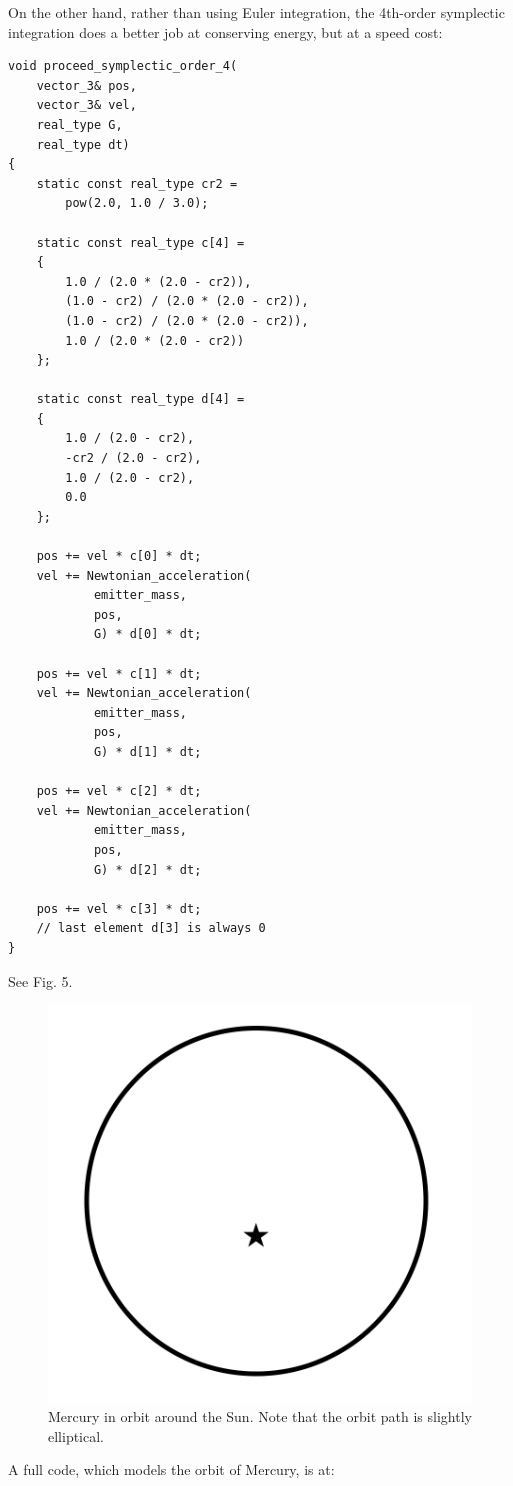 \documentclass[12pt]{article}
\begin{document}
On the other hand, rather than using Euler integration, the 4th-order symplectic integration does a better job at conserving energy, but at a speed cost:
\begin{lstlisting}
void proceed_symplectic_order_4(
	vector_3& pos, 
	vector_3& vel, 
	real_type G, 
	real_type dt)
{
	static const real_type cr2 = 
		pow(2.0, 1.0 / 3.0);

	static const real_type c[4] =
	{
		1.0 / (2.0 * (2.0 - cr2)),
		(1.0 - cr2) / (2.0 * (2.0 - cr2)),
		(1.0 - cr2) / (2.0 * (2.0 - cr2)),
		1.0 / (2.0 * (2.0 - cr2))
	};

	static const real_type d[4] =
	{
		1.0 / (2.0 - cr2),
		-cr2 / (2.0 - cr2),
		1.0 / (2.0 - cr2),
		0.0
	};

	pos += vel * c[0] * dt;
	vel += Newtonian_acceleration(
			emitter_mass, 
			pos, 
			G) * d[0] * dt;

	pos += vel * c[1] * dt;
	vel += Newtonian_acceleration(
			emitter_mass, 
			pos, 
			G) * d[1] * dt;

	pos += vel * c[2] * dt;
	vel += Newtonian_acceleration(
			emitter_mass, 
			pos, 
			G) * d[2] * dt;

	pos += vel * c[3] * dt;
	// last element d[3] is always 0
}
\end{lstlisting}

See Fig. 5.
\begin{figure} 
\centering
  \includegraphics[width = 4 in]{mercury.png}
  \caption{
Mercury in orbit around the Sun.
Note that the orbit path is slightly elliptical.
}
\end{figure}

A full code, which models the orbit of Mercury, is at:
\end{document}

